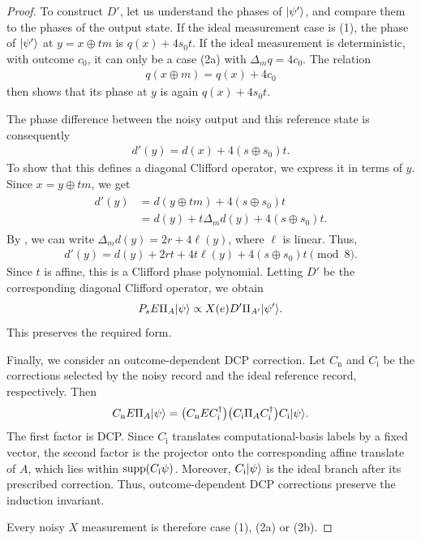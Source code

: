 \begin{proof}
    To construct $D'$, let us understand the phases of $|\psi'\rangle$, and compare them to the phases of the output state. If the ideal measurement case is (1), the phase of $|\psi'\rangle$ at
    $y=x\oplus tm$ is $q(x)+4s_0t$. If the ideal measurement is deterministic, with outcome $c_0$, it can only be a case (2a) with $\Delta_m q = 4c_0$. The relation
    \begin{align}
        q(x\oplus m)=q(x)+4c_0
    \end{align}
    then shows that its phase at $y$ is again $q(x)+4s_0t$.

    The phase difference between the noisy output and this
    reference state is consequently
    \begin{align}
        d'(y)=d(x)+4(s\oplus s_0)t.
    \end{align}
    To show that this defines a diagonal Clifford operator, we
    express it in terms of $y$. Since $x=y\oplus tm$, we get
    \begin{align}
        \begin{split}
            d'(y)
            &=d(y\oplus tm)+4(s\oplus s_0)t\\
            &=d(y)+t\Delta_m d(y)+4(s\oplus s_0)t.
        \end{split}
    \end{align}
    By , we can write
    $\Delta_m d(y)=2r+4\ell(y)$, where $\ell$ is linear. Thus,
    \begin{align}
        d'(y)
        =d(y)+2rt+4t\ell(y)+4(s\oplus s_0)t \pmod 8.
    \end{align}
    Since $t$ is affine, this is a Clifford phase polynomial.
    Letting $D'$ be the corresponding diagonal Clifford operator,
    we obtain
    \begin{align}
        P_sE\Pi_A|\psi\rangle
        \propto X(e)D'\Pi_{A'}|\psi'\rangle.
    \end{align}
    This preserves the required form.

    Finally, we consider an outcome-dependent DCP correction.
    Let $C_{\mathrm{n}}$ and $C_{\mathrm{i}}$ be the corrections selected by the noisy record and the ideal reference record, respectively.
    Then
    \begin{align}
        C_{\mathrm{n}}E\Pi_A|\psi\rangle
        =
        \bigl(C_{\mathrm{n}}EC_{\mathrm{i}}^\dagger\bigr)
        \bigl(C_{\mathrm{i}}\Pi_A C_{\mathrm{i}}^\dagger\bigr)
        C_{\mathrm{i}}|\psi\rangle.
    \end{align}
    The first factor is DCP.
    Since $C_{\mathrm{i}}$ translates computational-basis labels by a fixed vector, the second factor is the projector onto the corresponding affine translate of $A$, which lies within $\operatorname{supp}(C_{\mathrm{i}}\psi)$.
    Moreover, $C_{\mathrm{i}}|\psi\rangle$ is the ideal branch after its prescribed correction.
    Thus, outcome-dependent DCP corrections preserve the induction invariant.

    Every noisy $X$ measurement is therefore case (1), (2a) or (2b).
\end{proof}

